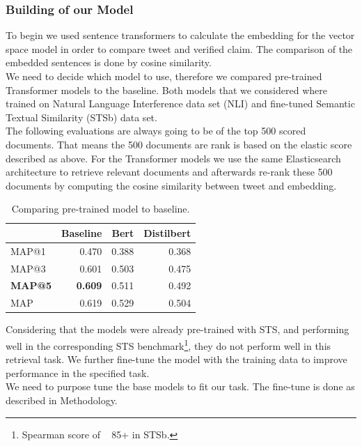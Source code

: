 \documentclass{article}
\begin{document}
\subsubsection{Building of our Model }
To begin we used sentence transformers to calculate the embedding for the vector space model in order to compare tweet and verified claim.
The comparison of the embedded sentences is done by cosine similarity.\\
We need to decide which model to use, therefore we compared pre-trained Transformer models to the baseline.
Both models that we considered where  trained on Natural Language Interference\cite{DBLP:conf/emnlp/BowmanAPM15} data set (NLI) and fine-tuned Semantic Textual Similarity\cite{DBLP:conf/semeval/CerDALS17} (STSb) data set.\\
The following evaluations are always going to be of the top 500 scored documents.
That means the 500 documents are rank is based on the elastic score described as above. For the Transformer models we use the same Elasticsearch architecture to retrieve relevant documents and afterwards re-rank these 500 documents by computing the cosine similarity between tweet and embedding.\\ 
\begin{table}[H]
\centering
\begin{threeparttable}
    \begin{tabular}{lrrr}
        \toprule
         & Baseline & Bert & Distilbert \\ \midrule
        MAP@1 		& 0.470 & 0.388 & 0.368 \\
	  MAP@3 		& 0.601 & 0.503 & 0.475\\
        \textbf{MAP@5} & \textbf{0.609} & 0.511 & 0.492\\
        MAP 			& 0.619 & 0.529 & 0.504 \\ \bottomrule
   \end{tabular}
\caption{Comparing pre-trained model to baseline.\\}
\end{threeparttable}
\end{table}
\noindent Considering that the models were already pre-trained with STS, and performing well in the corresponding STS benchmark\footnote{Spearman score of ~ 85+ in STSb.}, they do not perform well in this retrieval task.
We further fine-tune the model with the training data to improve performance in the specified task.\\
We need to purpose tune the base models to fit our task.
The fine-tune is done as described in Methodology.
\end{document}
